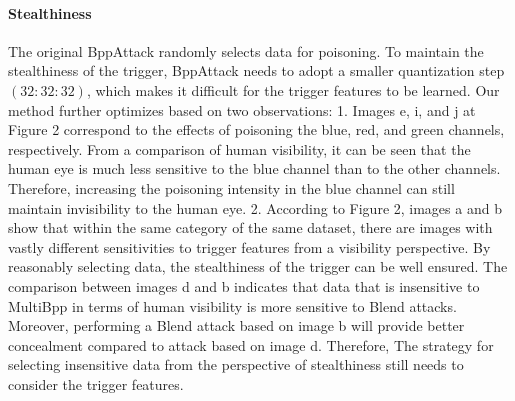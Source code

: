 \documentclass{article}
\begin{document}
\paragraph{Stealthiness}
The original BppAttack randomly selects data for poisoning. To maintain the stealthiness of the trigger, BppAttack needs to adopt a smaller quantization step \((32:32:32)\), which makes it difficult for the trigger features to be learned. Our method further optimizes based on two observations: 1. Images e, i, and j at Figure 2 correspond to the effects of poisoning the blue, red, and green channels, respectively. From a comparison of human visibility, it can be seen that the human eye is much less sensitive to the blue channel than to the other channels. Therefore, increasing the poisoning intensity in the blue channel can still maintain invisibility to the human eye. 2. According to Figure 2, images a and b show that within the same category of the same dataset, there are images with vastly different sensitivities to trigger features from a visibility perspective. By reasonably selecting data, the stealthiness of the trigger can be well ensured. The comparison between images d and b indicates that data that is insensitive to MultiBpp in terms of human visibility is more sensitive to Blend attacks. Moreover, performing a Blend attack based on image b will provide better concealment compared to attack based on image d. Therefore, The strategy for selecting insensitive data from the perspective of stealthiness still needs to consider the trigger features. 
\end{document}
